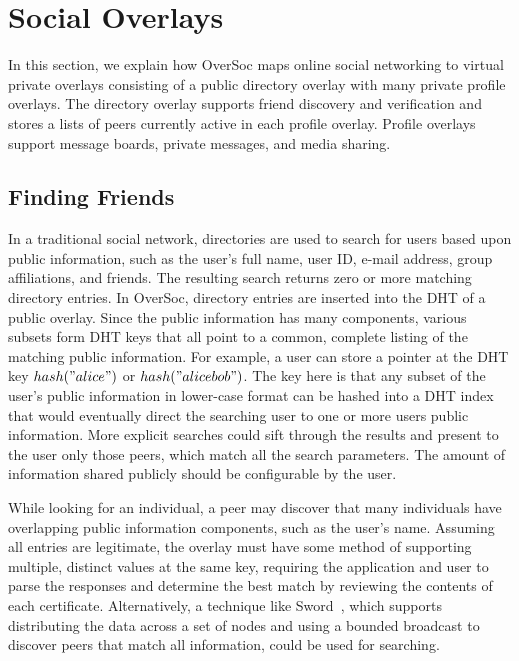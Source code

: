 \documentclass{IEEEtran}
\begin{document}
\section{Social Overlays}
\label{social_overlays}

In this section, we explain how OverSoc maps online social networking to
virtual private overlays consisting of a public directory overlay with many
private profile overlays.  The directory overlay supports friend discovery and
verification and stores a lists of peers currently active in each profile
overlay.  Profile overlays support message boards, private messages, and media
sharing.

\subsection{Finding Friends}

In a traditional social network, directories are used to search for users based
upon public information, such as the user's full name, user ID, e-mail address,
group affiliations, and friends.  The resulting search returns zero or more
matching directory entries.  In OverSoc, directory entries are inserted into
the DHT of a public overlay.  Since the public information has many components,
various subsets form DHT keys that all point to a common, complete listing of
the matching public information.  For example, a user can store a pointer at
the DHT key $hash("alice")$ or $hash("alice bob")$.  The key here is that any
subset of the user's public information in lower-case format can be hashed into
a DHT index that would eventually direct the searching user to one or more
users public information.  More explicit searches could sift through the
results and present to the user only those peers, which match all the search
parameters.  The amount of information shared publicly should be configurable
by the user.

While looking for an individual, a peer may discover that many individuals have
overlapping public information components, such as the user's name.  Assuming
all entries are legitimate, the overlay must have some method of supporting
multiple, distinct values at the same key, requiring the application and user
to parse the responses and determine the best match by reviewing the contents
of each certificate.  Alternatively, a technique like Sword~\cite{sword}, which
supports distributing the data across a set of nodes and using a bounded
broadcast to discover peers that match all information, could be used for
searching.
\end{document}

